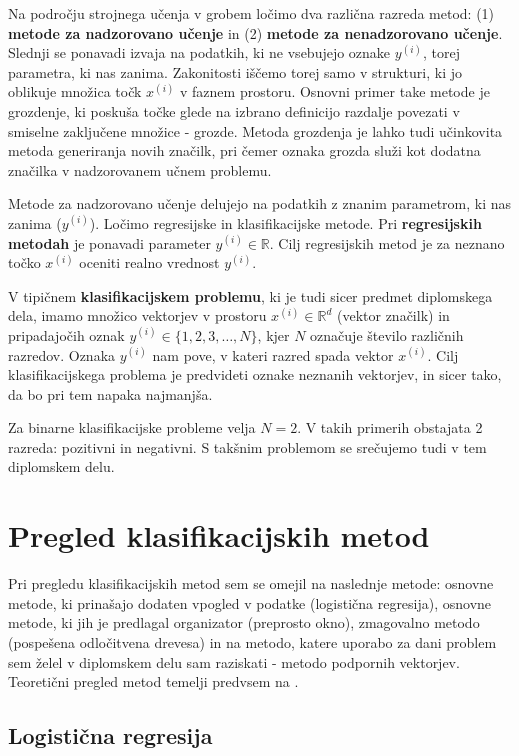 \documentclass[11pt,a4paper,openany]{book}
\begin{document}
Na področju strojnega učenja v grobem ločimo dva različna razreda metod: (1) \textbf{metode za nadzorovano učenje} in (2) \textbf{metode za nenadzorovano učenje}. Slednji se ponavadi izvaja na podatkih, ki ne vsebujejo oznake $y^{(i)}$, torej parametra, ki nas zanima. Zakonitosti iščemo torej samo v strukturi, ki jo oblikuje množica točk $x^{(i)}$ v faznem prostoru. Osnovni primer take metode je grozdenje, ki poskuša točke glede na izbrano definicijo razdalje povezati v smiselne zaključene množice - grozde. Metoda grozdenja je lahko tudi učinkovita metoda generiranja novih značilk, pri čemer oznaka grozda služi kot dodatna značilka v nadzorovanem učnem problemu.

Metode za nadzorovano učenje delujejo na podatkih z znanim parametrom, ki nas zanima ($y^{(i)}$). Ločimo regresijske in klasifikacijske metode. Pri \textbf{regresijskih metodah} je ponavadi parameter $y^{(i)} \in \mathbb{R}$. Cilj regresijskih metod je za neznano točko $x^{(i)}$ oceniti realno vrednost $y^{(i)}$. 

V tipičnem \textbf{klasifikacijskem problemu}, ki je tudi sicer predmet diplomskega dela, imamo množico vektorjev v prostoru $x^{(i)} \in \mathbb{R}^d$ (vektor značilk) in pripadajočih oznak $y^{(i)} \in \{1, 2, 3, \ldots, N\}$, kjer $N$ označuje število različnih razredov. Oznaka $y^{(i)}$ nam pove, v kateri razred spada vektor $x^{(i)}$. Cilj klasifikacijskega problema je predvideti oznake neznanih vektorjev, in sicer tako, da bo pri tem napaka najmanjša.

Za binarne klasifikacijske probleme velja $N = 2$. V takih primerih obstajata 2 razreda: pozitivni in negativni. S takšnim problemom se srečujemo tudi v tem diplomskem delu.


\section{Pregled klasifikacijskih metod}

Pri pregledu klasifikacijskih metod sem se omejil na naslednje metode: osnovne metode, ki prinašajo dodaten vpogled v podatke (logistična regresija), osnovne metode, ki jih je predlagal organizator (preprosto okno), zmagovalno metodo (pospešena odločitvena drevesa) in na metodo, katere uporabo za dani problem sem želel v diplomskem delu sam raziskati - metodo podpornih vektorjev. Teoretični pregled metod temelji predvsem na \cite{AndrewNgML}.


\subsection{Logistična regresija}
\end{document}
